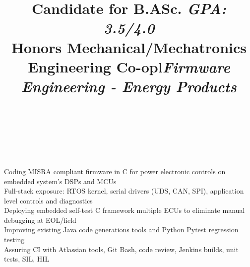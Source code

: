 \documentclass[mm]{res}
\begin{document}
\begin{resume}
\title{Candidate for B.ASc. \textsl{GPA: 3.5/4.0}\\
Honors Mechanical/Mechatronics Engineering Co-op}
\begin{position}
\end{position}


\toprule

\section{\headingexperience}
\begin{format}
\\
\title{l}\\
\body\\
\end{format}

\title{\textsl{Firmware Engineering - Energy Products}}
\begin{position}
\tb Coding MISRA compliant firmware in C for power electronic controls on embedded system's DSPs and MCUs\\
\tb Full-stack exposure: RTOS kernel, serial drivers (UDS, CAN, SPI), application level controls and diagnostics\\
\tb Deploying embedded self-test C framework multiple ECUs to eliminate manual debugging at EOL/field\\
\tb Improving existing Java code generations tools and Python Pytest regression testing\\
\tb Assuring CI with Atlassian tools, Git Bash, code review, Jenkins builds, unit tests, SIL, HIL
\end{position}


\end{resume}
\end{document}
